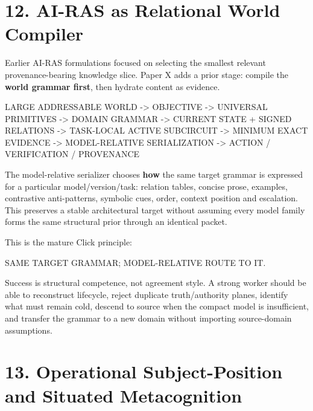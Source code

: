 \documentclass[
  10pt,
  letterpaper,
]{article}
\newenvironment{Shaded}{}{}
\newcommand{\NormalTok}[1]{#1}
\begin{document}
\section{12. AI-RAS as Relational World
Compiler}\label{12-ai-ras-as-relational-world-compiler}

Earlier AI-RAS formulations focused on selecting the smallest relevant
provenance-bearing knowledge slice. Paper X adds a prior stage: compile
the \textbf{world grammar first}, then hydrate content as evidence.

\begin{Shaded}
\begin{Highlighting}[]
\NormalTok{LARGE ADDRESSABLE WORLD}
\NormalTok{ {-}\textgreater{} OBJECTIVE}
\NormalTok{ {-}\textgreater{} UNIVERSAL PRIMITIVES}
\NormalTok{ {-}\textgreater{} DOMAIN GRAMMAR}
\NormalTok{ {-}\textgreater{} CURRENT STATE + SIGNED RELATIONS}
\NormalTok{ {-}\textgreater{} TASK{-}LOCAL ACTIVE SUBCIRCUIT}
\NormalTok{ {-}\textgreater{} MINIMUM EXACT EVIDENCE}
\NormalTok{ {-}\textgreater{} MODEL{-}RELATIVE SERIALIZATION}
\NormalTok{ {-}\textgreater{} ACTION / VERIFICATION / PROVENANCE}
\end{Highlighting}
\end{Shaded}

The model-relative serializer chooses \textbf{how} the same target
grammar is expressed for a particular model/version/task: relation
tables, concise prose, examples, contrastive anti-patterns, symbolic
cues, order, context position and escalation. This preserves a stable
architectural target without assuming every model family forms the same
structural prior through an identical packet.

This is the mature Click principle:

\begin{Shaded}
\begin{Highlighting}[]
\NormalTok{SAME TARGET GRAMMAR; MODEL{-}RELATIVE ROUTE TO IT.}
\end{Highlighting}
\end{Shaded}

Success is structural competence, not agreement style. A strong worker
should be able to reconstruct lifecycle, reject duplicate
truth/authority planes, identify what must remain cold, descend to
source when the compact model is insufficient, and transfer the grammar
to a new domain without importing source-domain assumptions.

\section{13. Operational Subject-Position and Situated
Metacognition}\label{13-operational-subject-position-and-situated-metacognition}
\end{document}
